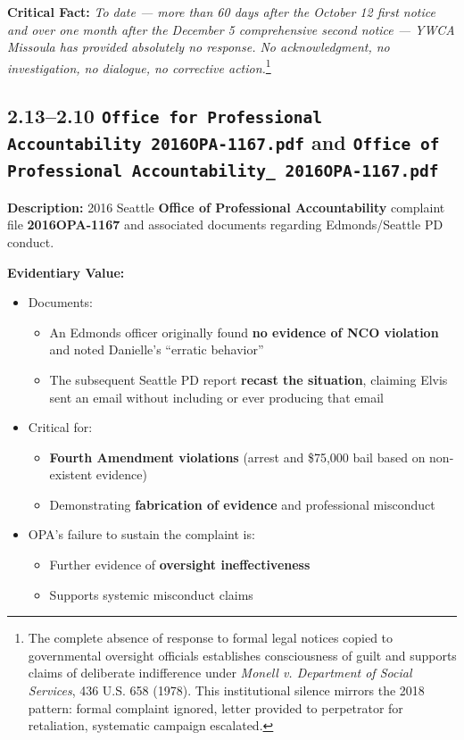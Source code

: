 \documentclass[11pt, letterpaper]{article}
\begin{document}
\textbf{Critical Fact:} \textit{To date --- more than 60 days after the October 12 first notice and over one month after the December 5 comprehensive second notice --- YWCA Missoula has provided absolutely no response. No acknowledgment, no investigation, no dialogue, no corrective action.}\footnote{The complete absence of response to formal legal notices copied to governmental oversight officials establishes consciousness of guilt and supports claims of deliberate indifference under \textit{Monell v. Department of Social Services}, 436 U.S. 658 (1978). This institutional silence mirrors the 2018 pattern: formal complaint ignored, letter provided to perpetrator for retaliation, systematic campaign escalated.}

\subsection{2.13--2.10 \texttt{Office for Professional Accountability 2016OPA-1167.pdf} and \texttt{Office of Professional Accountability\_ 2016OPA-1167.pdf}}

\textbf{Description:} 2016 Seattle \textbf{Office of Professional Accountability} complaint file \textbf{2016OPA-1167} and associated documents regarding Edmonds/Seattle PD conduct.

\textbf{Evidentiary Value:}

\begin{itemize}[leftmargin=*]
  \item Documents:
    \begin{itemize}
      \item An Edmonds officer originally found \textbf{no evidence of NCO violation} and noted Danielle's ``erratic behavior''
      \item The subsequent Seattle PD report \textbf{recast the situation}, claiming Elvis sent an email without including or ever producing that email
    \end{itemize}
  \item Critical for:
    \begin{itemize}
      \item \textbf{Fourth Amendment violations} (arrest and \$75,000 bail based on non-existent evidence)
      \item Demonstrating \textbf{fabrication of evidence} and professional misconduct
    \end{itemize}
  \item OPA's failure to sustain the complaint is:
    \begin{itemize}
      \item Further evidence of \textbf{oversight ineffectiveness}
      \item Supports systemic misconduct claims
    \end{itemize}
\end{itemize}
\end{document}
